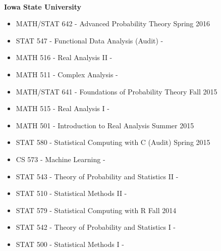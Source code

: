 \documentclass{res} %
\begin{document}
\begin{resume}
\hrulefill \\
{\bf Iowa State University }
\begin{itemize}\itemsep -2pt 
\item MATH/STAT 642 - Advanced Probability Theory \dotfill Spring 2016 
\item STAT 547 - Functional Data Analysis (Audit) \hfill -
\item MATH 516 - Real Analysis II \hfill - 
\item MATH 511 - Complex Analysis \hfill -
\item MATH/STAT 641 - Foundations of Probability Theory \dotfill Fall 2015
\item MATH 515 - Real Analysis I \hfill -
\item MATH 501 - Introduction to Real Analysis \dotfill Summer 2015 
\item STAT 580 - Statistical Computing with C (Audit) \dotfill Spring 2015
\item CS 573 - Machine Learning \hfill -
\item STAT 543 - Theory of Probability and Statistics II \hfill -
\item STAT 510 - Statistical Methods II \hfill -
\item STAT 579 - Statistical Computing with R \dotfill Fall 2014
\item STAT 542 - Theory of Probability and Statistics I \hfill -
\item STAT 500 - Statistical Methods I \hfill -
\end{itemize}



\end{resume} 
\end{document}
